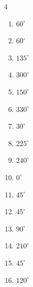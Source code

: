 \begin{multicols}{4}
\begin{enumerate}
  \item $\displaystyle 60^{\circ}$

  \item $\displaystyle 60^{\circ}$

  \item $\displaystyle 135^{\circ}$

  \item $\displaystyle 300^{\circ}$

  \item $\displaystyle 150^{\circ}$

  \item $\displaystyle 330^{\circ}$

  \item $\displaystyle 30^{\circ}$

  \item $\displaystyle 225^{\circ}$

  \item $\displaystyle 240^{\circ}$

  \item $\displaystyle 0^{\circ}$
        \phantom{$\displaystyle =0$}

  \item $\displaystyle 45^{\circ}$

  \item $\displaystyle 45^{\circ}$

  \item $\displaystyle 90^{\circ}$

  \item $\displaystyle 210^{\circ}$

  \item $\displaystyle 45^{\circ}$

  \item $\displaystyle 120^{\circ}$


\end{enumerate}
\end{multicols}
